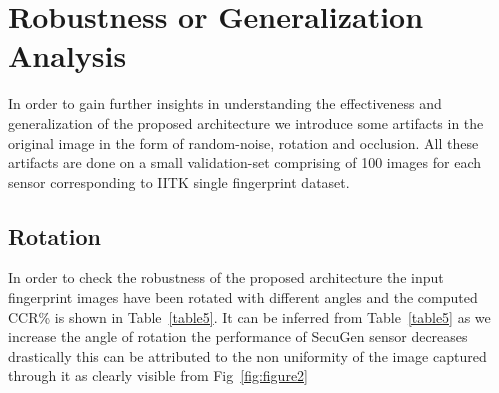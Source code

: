 \section{Robustness or Generalization Analysis}
In order to gain further insights in understanding the effectiveness and generalization of the proposed architecture we introduce some artifacts in the original image in the form of random-noise, rotation and occlusion. All these artifacts are done on a small validation-set comprising of 100 images for each sensor corresponding to IITK single fingerprint dataset.

\subsection{Rotation}

	In order to check the robustness of the proposed architecture the input fingerprint images have been rotated with different angles and the computed CCR\% is shown in Table~\ref{table5}. It can be inferred from Table~\ref{table5} as we increase the angle of rotation the performance of SecuGen sensor decreases drastically this can be attributed to the non uniformity of the image captured through it as clearly visible from Fig~\ref{fig:figure2}

